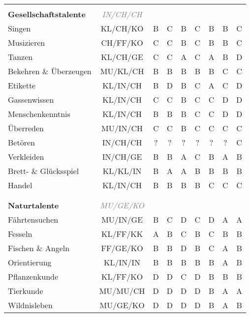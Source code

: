 \begin{center}
\begin{longtable}{|l|c|c|c|c|c|c|c|c|}
\hline
\multicolumn{9}{|l|}{} \\
\multicolumn{1}{|l}{\textbf{Gesellschaftstalente}} & \multicolumn{1}{c}{\textcolor{gray}{\textit{IN/CH/CH}}} & \multicolumn{7}{r|}{} \\
\hline
Singen\footnotemark[1] & KL/CH/KO & B & C & B & C & B & B & C \\
\hline
Musizieren & CH/FF/KO & C & C & B & C & B & B & C \\
\hline
Tanzen & KL/CH/GE & C & C & A & C & A & B & D \\
\hline
Bekehren \& Überzeugen & MU/KL/CH & B & B & B & B & B & C & C \\
\hline
Etikette\footnotemark[1] & KL/IN/CH & B & D & B & C & A & C & D \\
\hline
Gassenwissen & KL/IN/CH & C & C & B & C & C & D & D \\
\hline
Menschenkenntnis & KL/IN/CH & B & B & B & C & C & D & D \\
\hline
Überreden & MU/IN/CH & C & C & B & C & C & C & C \\
\hline
Betören\footnotemark[1] & IN/CH/CH & ? & ? & ? & ? & ? & ? & C\footnotemark[2] \\
\hline
Verkleiden & IN/CH/GE & B & B & A & C & B & A & B \\
\hline
Brett- \& Glücksspiel & KL/KL/IN & B & A & A & B & B & B & B \\
\hline
Handel\footnotemark[1] & KL/IN/CH & B & B & B & B & C & C & C \\


\hline
\multicolumn{9}{|l|}{} \\
\multicolumn{9}{|l|}{} \\
\hline
\multicolumn{1}{|l}{\textbf{Naturtalente}} & \multicolumn{1}{c}{\textcolor{gray}{\textit{MU/GE/KO}}} & \multicolumn{7}{r|}{} \\
\hline
Fährtensuchen & MU/IN/GE & B & C & D & C & D & A & A \\
\hline
Fesseln & KL/FF/KK & A & B & C & B & C & B & B \\
\hline
Fischen \& Angeln & FF/GE/KO & B & B & D & B & C & A & B \\
\hline
Orientierung & KL/IN/IN & B & B & B & B & B & A & B \\
\hline
Pflanzenkunde & KL/FF/KO & D & D & C & D & B & B & B \\
\hline
Tierkunde & MU/MU/CH & D & D & D & D & B & A & A \\
\hline
Wildnisleben & MU/GE/KO & D & D & D & D & B & A & B \\



\end{longtable}
\end{center}
